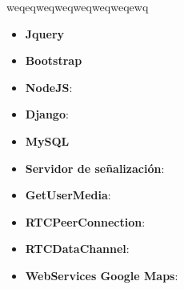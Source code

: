 \documentclass[notes,slidesec,a4]{seminar}
\begin{document}

\begin{hslide}
\end{hslide}

\begin{hslide}
weqeqweqweqweqweqweqewq
\end{hslide}

\begin{hslide}
\begin{itemize}
\item \textbf{Jquery}
\item \textbf{Bootstrap}
\end{itemize}
\end{hslide}

\begin{hslide}
\begin{itemize}
\item \textbf{NodeJS}:
\item \textbf{Django}:
\end{itemize}
\end{hslide}

\begin{hslide}
\begin{itemize}
\item \textbf{MySQL}
\end{itemize}
\end{hslide}


\begin{hslide}
\begin{itemize}
\item \textbf{Servidor de señalización}:
\item \textbf{GetUserMedia}:
\item \textbf{RTCPeerConnection}:
\item \textbf{RTCDataChannel}:

\end{itemize}
\end{hslide}


\begin{hslide}
\begin{itemize}
\item \textbf{WebServices Google Maps}:
\end{itemize}
\end{hslide}
\end{document}
